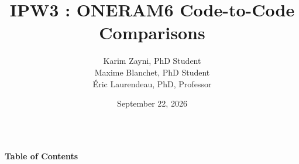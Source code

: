 \documentclass[10pt,aspectratio=169,xcolor={table,xcdraw}]{beamer}
\begin{document}
\title [IPW3 : ONERAM6]{\large IPW3 : ONERAM6 Code-to-Code Comparisons} 

\author[]{\small Karim Zayni, PhD Student \\ Maxime Blanchet, PhD Student \\ Éric Laurendeau, PhD, Professor}


\date{\small September 22, 2026}

\begin{frame}[plain]
\vspace{-0.5cm}
\begin{columns}
\titlepage
{}
\end{columns}
\end{frame}

\begin{frame}{\small \textbf{Table of Contents}}
\small
\tableofcontents
\end{frame}








\end{document}
